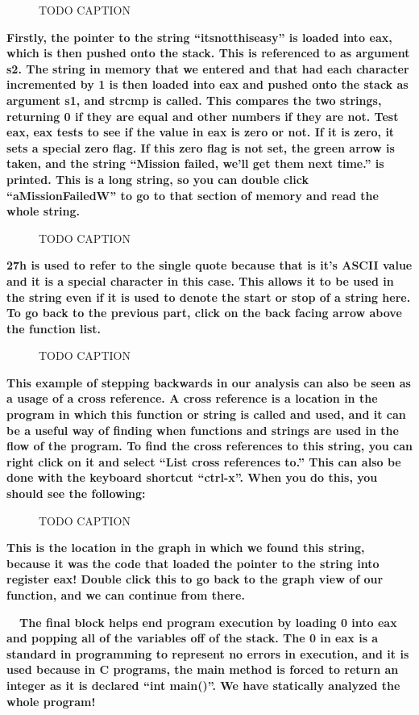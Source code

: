 \documentclass[letterpaper]{article}
\newcommand{\sitfig}[3]{
\begin{figure}[H]
\centering
\makebox[\textwidth][c]{
#2
}
\caption{#3}
\label{#1}
\end{figure}
}
\newcommand{\sitgfx}[4][scale=1.0]{
\sitfig{#3}{\texttt{[image: \#2]}}{#4}
}
\begin{document}
  
\sitgfx[width=6.4898in,height=3.948in]{FINALWORKINGDOCFORMERLYPRECURSOR-img049.png}{fig:unk}{TODO CAPTION}
 \textbf{Firstly, the pointer to the string ``itsnotthiseasy'' is loaded into eax, which is then pushed onto the stack.
This is referenced to as argument s2. The string in memory that we entered and that had each character incremented by 1
is then loaded into eax and pushed onto the stack as argument s1, and strcmp is called. This compares the two strings,
returning 0 if they are equal and other numbers if they are not. Test eax, eax tests to see if the value in eax is zero
or not. If it is zero, it sets a special zero flag. If this zero flag is not set, the green arrow is taken, and the
string ``Mission failed, we'll get them next time.'' is printed. This is a long string, so you can double click
``aMissionFailedW'' to go to that section of memory and read the whole string.}  
\sitgfx[width=6.5in,height=0.6563in]{FINALWORKINGDOCFORMERLYPRECURSOR-img050.png}{fig:unk}{TODO CAPTION}
 \textbf{27h is used to refer to the single quote because that is it's ASCII value and it is a special character in this
case. This allows it to be used in the string even if it is used to denote the start or stop of a string here. To go
back to the previous part, click on the back facing arrow above the function list.}

  
\sitgfx[width=4.1252in,height=2.1772in]{FINALWORKINGDOCFORMERLYPRECURSOR-img051.png}{fig:unk}{TODO CAPTION}
 \textbf{\newline
This example of stepping backwards in our analysis can also be seen as a usage of a cross reference. A cross reference
is a location in the program in which this function or string is called and used, and it can be a useful way of finding
when functions and strings are used in the flow of the program. To find the cross references to this string, you can
right click on it and select ``List cross references to.'' This can also be done with the keyboard shortcut ``ctrl-x''.
When you do this, you should see the following:}

  
\sitgfx[width=6.4898in,height=1.6043in]{FINALWORKINGDOCFORMERLYPRECURSOR-img052.png}{fig:unk}{TODO CAPTION}
 

\textbf{This is the location in the graph in which we found this string, because it was the code that loaded the pointer
to the string into register eax! Double click this to go back to the graph view of our function, and we can continue
from there.}

\textbf{ \ \ The final block helps end program execution by loading 0 into eax and popping all of the variables off of
the stack. The 0 in eax is a standard in programming to represent no errors in execution, and it is used because in C
programs, the main method is forced to return an integer as it is declared ``int main()''. We have statically analyzed
the whole program!}
\end{document}
